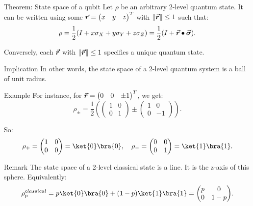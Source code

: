 \documentclass[a4paper]{article}
\begin{document}
\begin{parag}{Theorem: State space of a qubit}
    Let $\rho$ be an arbitrary 2-level quantum state. It can be written using some $\bm{\protect\vec{r}} = \begin{pmatrix} x & y & z \end{pmatrix}^T$ with $\left\|\bvec{r}\right\| \leq 1$ such that: 
    \[\rho = \frac{1}{2}\left(I + x \sigma_X + y \sigma_Y + z \sigma_Z\right) = \frac{1}{2}\left(I + \bvec{r} \dotprod \bvec{\sigma}\right).\]

    Conversely, each $\bm{\protect\vec{r}}$ with $\left\|\bvec{r}\right\| \leq 1$ specifies a unique quantum state.
    
    \begin{subparag}{Implication}
        In other words, the state space of a 2-level quantum system is a ball of unit radius.
    \end{subparag}

    \begin{subparag}{Example}
        For instance, for $\bm{\protect\vec{r}} = \begin{pmatrix} 0 & 0 & \pm1 \end{pmatrix}^T$, we get: 
        \[\rho_{\pm} = \frac{1}{2} \left(\begin{pmatrix} 1 & 0 \\ 0 & 1 \end{pmatrix} \pm \begin{pmatrix} 1 & 0 \\ 0 & -1 \end{pmatrix}\right).\]

        So: 
        \[\rho_+ = \begin{pmatrix} 1 & 0 \\ 0 & 0 \end{pmatrix} = \ket{0}\bra{0}, \mathspace \rho_- = \begin{pmatrix} 0 & 0 \\ 0 & 1 \end{pmatrix} = \ket{1}\bra{1}.\]
    \end{subparag}

    \begin{subparag}{Remark}
        The state space of a 2-level classical state is a line. It is the z-axis of this sphere. Equivalently: 
        \[\rho_p^{classical} = p \ket{0}\bra{0} + \left(1 -p\right)\ket{1}\bra{1} = \begin{pmatrix} p & 0 \\ 0 & 1-p \end{pmatrix}.\]


\end{subparag}
\end{parag}
\end{document}
